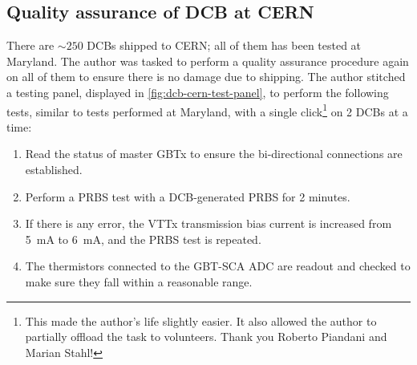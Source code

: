 \subsection{Quality assurance of DCB at CERN}
\label{dcb-qa}

There are $\sim 250$ DCBs shipped to CERN;
all of them has been tested at Maryland.
The author was tasked to perform a quality assurance procedure again on all of
them to ensure there is no damage due to shipping.
The author stitched a testing panel,
displayed in \cref{fig:dcb-cern-test-panel},
to perform the following tests,
similar to tests performed at Maryland,
with a single click\footnote{
    This made the author's life slightly easier.
    It also allowed the author to partially offload the task to volunteers.
    Thank you Roberto Piandani and Marian Stahl!
} on 2 DCBs at a time:

\begin{enumerate}
    \item Read the status of master GBTx to ensure the bi-directional
        connections are established.

    \item Perform a PRBS test with a DCB-generated PRBS for 2 minutes.
    \item If there is any error, the VTTx transmission bias current is
        increased from 5~mA to 6~mA, and the PRBS test is repeated.
    \item The thermistors connected to the GBT-SCA ADC are readout and checked
        to make sure they fall within a reasonable range.
\end{enumerate}

